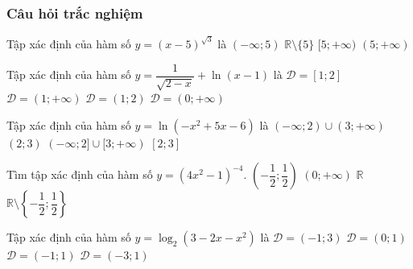 \subsubsection{Câu hỏi trắc nghiệm}
\begin{ex}%
	Tập xác định của hàm số $y=(x-5)^{\sqrt{3}}$ là
	\choice
	{$(-\infty;5)$}
	{$\mathbb{R}\setminus\{5\}$}
	{$[5;+\infty)$}
	{\True $(5;+\infty)$}
\end{ex}
\begin{ex}%
	Tập xác định của hàm số $y=\dfrac{1}{\sqrt{2-x}}+\ln(x-1)$ là 
	\choice
	{$\mathscr{D}=[1; 2]$}
	{$\mathscr{D}=(1;+\infty)$}
	{\True $\mathscr{D}=(1; 2)$}
	{$\mathscr{D}=(0;+\infty)$}
\end{ex}
\begin{ex}%
	Tập xác định của hàm số  $y=\ln\left(-x^2+5x-6\right)$ là
	\choice
	{$(-\infty; 2)\cup(3;+\infty)$}
	{\True $(2; 3)$}
	{$(-\infty; 2]\cup[3;+\infty)$}
	{$[2; 3]$}
\end{ex}
\begin{ex}%
	Tìm tập xác định của hàm số $y=\left(4x^2-1\right)^{-4}$. 
	\choice
	{$\left(-\dfrac{1}{2};\dfrac{1}{2}\right)$}
	{$(0;+\infty)$}
	{$\mathbb{R}$}
	{\True $\mathbb{R}\setminus\left\{-\dfrac{1}{2};\dfrac{1}{2}\right\}$}
\end{ex}
\begin{ex}%
	Tập xác định của hàm số $y=\log_2\left(3-2x-x^2\right)$ là 
	\choice
	{$\mathscr{D}=(-1;3)$}
	{$\mathscr{D}=(0;1)$}
	{$\mathscr{D}=(-1;1)$}
	{\True $\mathscr{D}=(-3;1)$}
\end{ex}
